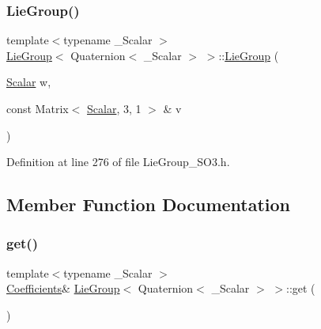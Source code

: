 \subsubsection{\texorpdfstring{Lie\+Group()}{LieGroup()}\hspace{0.1cm}{\footnotesize\ttfamily [9/9]}}
{\footnotesize\ttfamily template$<$typename \+\_\+\+Scalar $>$ \\
\hyperlink{class_lie_group}{Lie\+Group}$<$ Quaternion$<$ \+\_\+\+Scalar $>$ $>$\+::\hyperlink{class_lie_group}{Lie\+Group} (\begin{DoxyParamCaption}\item[{\hyperlink{class_lie_group_3_01_quaternion_3_01___scalar_01_4_01_4_a5c9cc4f61c2a1870f44da7951225dc4e}{Scalar}}]{w,  }\item[{const Matrix$<$ \hyperlink{class_lie_group_3_01_quaternion_3_01___scalar_01_4_01_4_a5c9cc4f61c2a1870f44da7951225dc4e}{Scalar}, 3, 1 $>$ \&}]{v }\end{DoxyParamCaption})\hspace{0.3cm}{\ttfamily [inline]}}



Definition at line 276 of file Lie\+Group\+\_\+\+S\+O3.\+h.



\subsection{Member Function Documentation}
\hypertarget{class_lie_group_3_01_quaternion_3_01___scalar_01_4_01_4_aec4805ed17f1c1ce893bcfdd8776deb2}{}\label{class_lie_group_3_01_quaternion_3_01___scalar_01_4_01_4_aec4805ed17f1c1ce893bcfdd8776deb2} 
\subsubsection{\texorpdfstring{get()}{get()}\hspace{0.1cm}{\footnotesize\ttfamily [1/2]}}
{\footnotesize\ttfamily template$<$typename \+\_\+\+Scalar $>$ \\
\hyperlink{class_lie_group_3_01_quaternion_3_01___scalar_01_4_01_4_a80504cfb3bcbf55c7d4c1e377ef9f782}{Coefficients}\& \hyperlink{class_lie_group}{Lie\+Group}$<$ Quaternion$<$ \+\_\+\+Scalar $>$ $>$\+::get (\begin{DoxyParamCaption}{ }\end{DoxyParamCaption})\hspace{0.3cm}{\ttfamily [inline]}}

